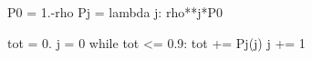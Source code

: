 
P0 = 1.-rho
Pj = lambda j: rho**j*P0

tot = 0.
j = 0
while tot <= 0.9:
   tot += Pj(j)
   j += 1


